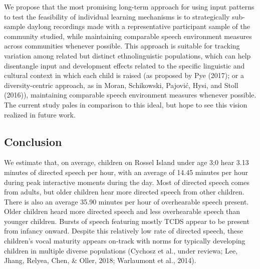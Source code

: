\documentclass[,man,floatsintext]{apa6}
\begin{document}
We propose that the most promising long-term approach for using input
patterns to test the feasibility of individual learning mechanisms is to
strategically sub-sample daylong recordings made with a representative
participant sample of the community studied, while maintaining
comparable speech environment measures across communities whenever
possible. This approach is suitable for tracking variation among related
but distinct ethnolinguistic populations, which can help disentangle
input and development effects related to the specific linguistic and
cultural context in which each child is raised (as proposed by Pye
(2017); or a diversity-centric approach, as in Moran, Schikowski,
Pajović, Hysi, and Stoll (2016)), maintaining comparable speech
environment measures whenever possible. The current study pales in
comparison to this ideal, but hope to see this vision realized in future
work.

\subsection{Conclusion}\label{disc-conclusion}

We estimate that, on average, children on Rossel Island under age 3;0
hear 3.13 minutes of directed speech per hour, with an average of 14.45
minutes per hour during peak interactive moments during the day. Most of
directed speech comes from adults, but older children hear more directed
speech from other children. There is also an average 35.90 minutes per
hour of overhearable speech present. Older children heard more directed
speech and less overhearable speech than younger children. Bursts of
speech featuring mostly TCDS appear to be present from infancy onward.
Despite this relatively low rate of directed speech, these children's
vocal maturity appears on-track with norms for typically developing
children in multiple diverse populations (Cychosz et al., under reviewa;
Lee, Jhang, Relyea, Chen, \& Oller, 2018; Warlaumont et al., 2014).
\end{document}
